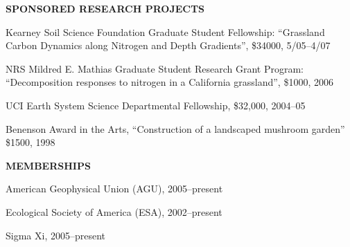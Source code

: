 \documentclass[12pt,twoside]{article}
\begin{document}
{\textbf{SPONSORED RESEARCH PROJECTS}
\begin{itemize*}
\item Kearney Soil Science Foundation Graduate Student Fellowship:
  ``Grassland Carbon Dynamics along Nitrogen and Depth Gradients'',
  \$34000, 5/05--4/07 
\item NRS Mildred E. Mathias Graduate Student Research Grant Program:
  ``Decomposition responses to nitrogen in a California grassland'',
  \$1000, 2006 
\item UCI Earth System Science Departmental Fellowship,
\$32,000, 2004--05
\item Benenson Award in the Arts,
  ``Construction of a landscaped mushroom garden''
\$1500, 1998
\end{itemize*}

\textbf{MEMBERSHIPS}
\begin{itemize*}
\item American Geophysical Union (AGU), 2005--present
\item Ecological Society of America (ESA), 2002--present
\item Sigma Xi, 2005--present
\end{itemize*}


}
\end{document}

